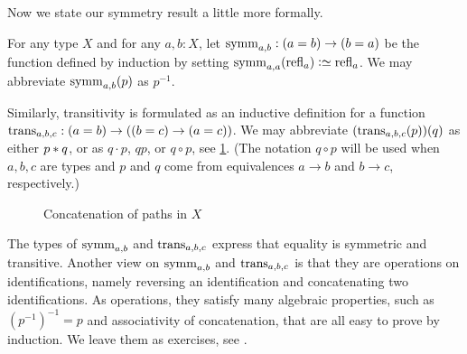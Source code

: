 Now we state our symmetry result a little more formally.

\begin{definition}\label{def:eq-symm}
For any type $X$ and for any $a,b:X$, let $\symm_{a,b} : (a=b) \to (b=a)$ 
be the function defined by induction by setting
$\symm_{a,a}(\refl a) \defeq \refl a$.
We may abbreviate $\symm_{a,b}(p)$ as $p^{-1}$.
\end{definition}

Similarly, transitivity is formulated as an inductive definition for 
a function $\trans_{a,b,c} : (a=b) \to ((b=c) \to (a=c))$.  We may
abbreviate $(\trans_{a,b,c}(p))(q)$ as either $p* q$, 
or as $q\cdot p$, $qp$, or $q\circ p$, see \cref{fig:path-concatenation}.
(The notation $q\circ p$ will be used when $a,b,c$ are types and
$p$ and $q$ come from equivalences $a\to b$ and $b\to c$, respectively.)


\begin{figure}
  \centering
  
  \caption{Concatenation of paths in $X$}
  \label{fig:path-concatenation}
\end{figure}

The types of $\symm_{a,b}$ and $\trans_{a,b,c}$ express that
equality is symmetric and transitive. Another view on
$\symm_{a,b}$ and $\trans_{a,b,c}$ is that they are
operations on identifications, namely reversing an identification
and concatenating two identifications. As operations, they satisfy
many algebraic properties, such as $(p^{-1})^{-1} = p$ and
associativity of concatenation, that are all easy to prove by induction. 
We leave them as exercises, see \cite[Lemma 2.1.4]{hottbook}. 

